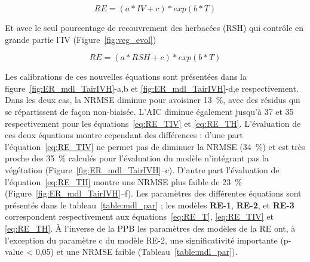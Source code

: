 \begin{equation} \label{eq:RE_TIV}
RE = (a*IV + c)*exp(b*T)
\end{equation}

Et avec le seul pourcentage de recouvrement des herbacées (RSH) qui contrôle en grande partie l'IV (Figure~\ref{fig:veg_evol})

\begin{equation} \label{eq:RE_TH}
RE = (a*RSH + c)*exp(b*T)
\end{equation}

Les calibrations de ces nouvelles équations sont présentées dans la figure~\ref{fig:ER_mdl_TairIVH}-a,b et \ref{fig:ER_mdl_TairIVH}-d,e respectivement.
Dans les deux cas, la NRMSE diminue pour avoisiner \SI{13}{\percent}, avec des résidus qui se répartissent de façon non-biaisée.
L'AIC diminue également jusqu'à 37 et 35 respectivement pour les équations~\ref{eq:RE_TIV} et \ref{eq:RE_TH}.
L'évaluation de ces deux équations montre cependant des différences :
d'une part l'équation~\ref{eq:RE_TIV} ne permet pas de diminuer la NRMSE (\SI{34}{\percent}) et est très proche des \SI{35}{\percent} calculés pour l'évaluation du modèle n'intégrant pas la végétation (Figure~\ref{fig:ER_mdl_TairIVH}--c).
D'autre part l'évaluation de l'équation~\ref{eq:RE_TH} montre une NRMSE plus faible de \SI{23}{\percent} (Figure~\ref{fig:ER_mdl_TairIVH}--f).
Les paramètres des différentes équations sont présentés dans le tableau~\ref{table:mdl_par} ; les modèles \textbf{RE-1}, \textbf{RE-2}, et \textbf{RE-3} correspondent respectivement aux équations~\ref{eq:RE_T}, \ref{eq:RE_TIV} et \ref{eq:RE_TH}.
À l'inverse de la PPB les paramètres des modèles de la RE ont, à l'exception du paramètre c du modèle RE-2, une significativité importante (p-value < 0,05) et une NRMSE faible (Tableau~\ref{table:mdl_par}).



%

